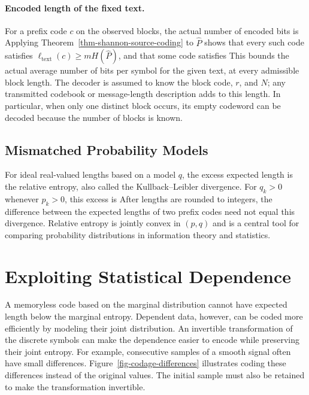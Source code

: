 \paragraph{Encoded length of the fixed text.}
For a prefix code $c$ on the observed blocks, the actual number of encoded bits is
Applying Theorem~\ref{thm-shannon-source-coding} to $\hat P$ shows that every such code satisfies $\ell_{\mathrm{text}}(c)\geq mH(\hat P)$, and that some code satisfies
This bounds the actual average number of bits per symbol for the given text, at every admissible block length. The decoder is assumed to know the block code, $r$, and $N$; any transmitted codebook or message-length description adds to this length. In particular, when only one distinct block occurs, its empty codeword can be decoded because the number of blocks is known.

\subsection{Mismatched Probability Models}

For ideal real-valued lengths based on a model $q$, the excess expected length is the relative entropy, also called the Kullback--Leibler divergence. For $q_k>0$ whenever $p_k>0$, this excess is
After lengths are rounded to integers, the difference between the expected lengths of two prefix codes need not equal this divergence. Relative entropy is jointly convex in $(p,q)$ and is a central tool for comparing probability distributions in information theory and statistics.


\section{Exploiting Statistical Dependence}

A memoryless code based on the marginal distribution cannot have expected length below the marginal entropy. Dependent data, however, can be coded more efficiently by modeling their joint distribution. An invertible transformation of the discrete symbols can make the dependence easier to encode while preserving their joint entropy. For example, consecutive samples of a smooth signal often have small differences. Figure~\ref{fig-codage-differences} illustrates coding these differences instead of the original values. The initial sample must also be retained to make the transformation invertible.


